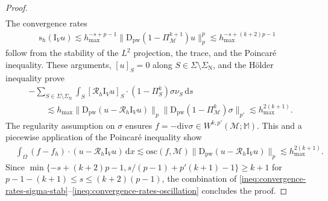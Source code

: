 \documentclass[a4paper]{amsart}
\numberwithin{equation}{section}
\renewcommand{\d}[1]{\,\mathrm{d}#1}
\renewcommand{\div}{\mathrm{div}}
\newcommand{\I}{\mathrm{I}}
\newcommand{\Mcal}{\mathcal{M}}
\newcommand{\pw}{\mathrm{pw}}
\newcommand{\D}{\mathrm{D}}
\newcommand{\s}{\mathrm{s}}
\newcommand{\M}{\mathbb{M}}
\newcommand{\osc}{\mathrm{osc}}
\theoremstyle{remark}
\begin{document}
\begin{proof}
\begin{align}
	\end{align}
	The convergence rates
	\begin{align}\label{ineq:convergence-rates-stab}
		\s_h(\I_V u) \lesssim h_{\max}^{-s + p - 1} \|\D_\pw(1 - \Pi_{\Mcal}^{k+1}) u\|_p^p \lesssim h_{\max}^{-s + (k+2)p - 1}
	\end{align}
	follow
	from the stability of the $L^2$ projection, the trace, and the Poincar\'e inequality.
	These arguments, $[u]_S = 0$ along $S \in \Sigma\setminus\Sigma_\mathrm{N}$, and the H\"older inequality prove
	\begin{align}\label{ineq:convergence-rates-trace-integrals}
		&- \sum_{S \in \Sigma \setminus \Sigma_\mathrm{N}} \int_S [\mathcal{R}_h \I_V u]_S \cdot (1 - \Pi_S^k)\sigma \nu_S \d{s}\nonumber\\
		&\qquad\lesssim h_{\max}\|\D_\pw(u - \mathcal{R}_h \I_V u)\|_p\|\D_\pw(1 - \Pi_\Mcal^k)\sigma\|_{p'} \lesssim h_{\max}^{2(k+1)}.
	\end{align}
	The regularity assumption on $\sigma$ ensures $f = - \div \sigma \in W^{k,p'}(\Mcal;\M)$. This and a piecewise application of the Poincar\'e inequality show
	\begin{align}\label{ineq:convergence-rates-oscillation}
		&\int_\Omega (f - f_h) \cdot (u - \mathcal{R}_h \I_V u) \d{x} \lesssim \osc(f,\Mcal)\|\D_\pw(u - \mathcal{R}_h \I_V u)\|_p \lesssim h_{\max}^{2(k+1)}.
	\end{align}	
	Since $\min\{-s + (k+2) p - 1, s/(p-1) + p'(k+1) - 1\} \geq k+1$ for $p-1-(k+1) \leq s \leq (k+2)(p-1)$, the combination of \eqref{ineq:convergence-rates-sigma-stab}--\eqref{ineq:convergence-rates-oscillation} concludes the proof.
\end{proof}
\end{document}

